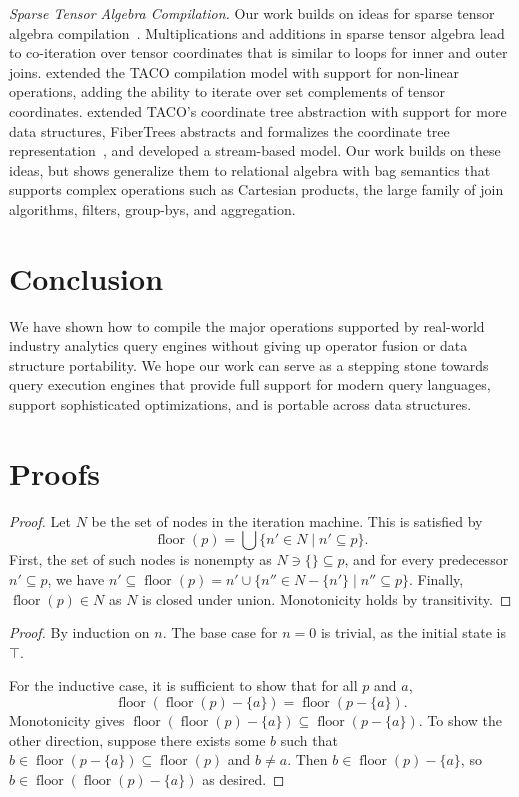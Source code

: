 \documentclass[acmsmall,screen,nonacm]{acmart}\settopmatter{printfolios=true,printccs=false,printacmref=false}
\DeclareMathOperator{\floor}{floor}
\begin{document}
\emph{Sparse Tensor Algebra Compilation.}
Our work builds on ideas for sparse tensor algebra compilation~\cite{kjolstad2017}. Multiplications and additions in sparse tensor algebra lead to co-iteration over tensor coordinates that is similar to loops for inner and outer joins. \citet{henry2017} extended the TACO compilation model with support for non-linear operations, adding the ability to iterate over set complements of tensor coordinates. \citet{chou2018} extended TACO's coordinate tree abstraction with support for more data structures,
FiberTrees abstracts and formalizes the coordinate tree representation~\cite{fibertrees}, and \citet{indexed-streams} developed a stream-based model. Our work builds on these ideas, but shows generalize them to relational algebra with bag semantics that supports complex operations such as Cartesian products, the large family of join algorithms, filters, group-bys, and aggregation.



\section{Conclusion}
We have shown how to compile the major operations supported by real-world industry analytics query engines without giving up operator fusion or data structure portability. We hope our work can serve as a stepping stone towards query execution engines that provide full support for modern query languages, support sophisticated optimizations, and is portable across data structures.



\clearpage
\appendix
\section{Proofs}
\lemfloor*
\begin{proof}
    Let $N$ be the set of nodes in the iteration machine.
    This is satisfied by
    \[ \floor(p) = \bigcup \{ n' \in N \mid n' \subseteq p \}. \]
    First, the set of such nodes is nonempty as
    $N \ni \{\} \subseteq p$,
    and for every predecessor $n' \subseteq p$, we have
    $n' \subseteq \floor(p) = n' \cup
    \{ n'' \in N - \{n'\} \mid n'' \subseteq p \}.$
    Finally, $\floor(p) \in N$ as $N$ is closed under union.
    Monotonicity holds by transitivity.
\end{proof}

\lemlatticedfa*
\begin{proof}
    By induction on $n$. The base case for $n = 0$ is trivial,
    as the initial state is $\top$.

    For the inductive case, it is sufficient to show that for all
    $p$ and $a$,
    \[ \floor(\floor(p) - \{a\}) = \floor(p - \{a\}). \]
    Monotonicity gives $\floor(\floor(p) - \{a\}) \subseteq \floor(p - \{a\})$.
    To show the other direction, suppose there exists some $b$ such
    that $b \in \floor(p - \{a\}) \subseteq \floor(p)$ and $b \ne a$. Then
    $b \in \floor(p) - \{a\}$, so $b \in \floor(\floor(p) - \{a\})$ as desired.
\end{proof}
\end{document}
